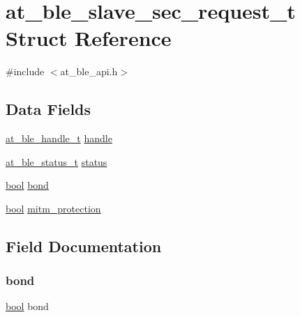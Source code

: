 \hypertarget{structat__ble__slave__sec__request__t}{}\section{at\+\_\+ble\+\_\+slave\+\_\+sec\+\_\+request\+\_\+t Struct Reference}
\label{structat__ble__slave__sec__request__t}


{\ttfamily \#include $<$at\+\_\+ble\+\_\+api.\+h$>$}

\subsection*{Data Fields}
\begin{DoxyCompactItemize}
\item 
\mbox{\hyperlink{at__ble__api_8h_abd23646d0c662860741f787efc8456f2}{at\+\_\+ble\+\_\+handle\+\_\+t}} \mbox{\hyperlink{structat__ble__slave__sec__request__t_ab8b0f353cb6a8d85f0822900e3b7cf35}{handle}}
\item 
\mbox{\hyperlink{group__error__codes__group_ga3b1db9b95feb157b3c188ca27fe76988}{at\+\_\+ble\+\_\+status\+\_\+t}} \mbox{\hyperlink{structat__ble__slave__sec__request__t_a0b48093fc2030779fc47e5216f8019e2}{status}}
\item 
\mbox{\hyperlink{group__group__sam0__utils_ga97a80ca1602ebf2303258971a2c938e2}{bool}} \mbox{\hyperlink{structat__ble__slave__sec__request__t_af408fae3fc79712c6c72a088b67c00d7}{bond}}
\item 
\mbox{\hyperlink{group__group__sam0__utils_ga97a80ca1602ebf2303258971a2c938e2}{bool}} \mbox{\hyperlink{structat__ble__slave__sec__request__t_a0430e2654fcb685cbe7fe84688c4a6bc}{mitm\+\_\+protection}}
\end{DoxyCompactItemize}


\subsection{Field Documentation}
\mbox{\label{structat__ble__slave__sec__request__t_af408fae3fc79712c6c72a088b67c00d7}} 
\subsubsection{\texorpdfstring{bond}{bond}}
{\footnotesize\ttfamily \mbox{\hyperlink{group__group__sam0__utils_ga97a80ca1602ebf2303258971a2c938e2}{bool}} bond}

